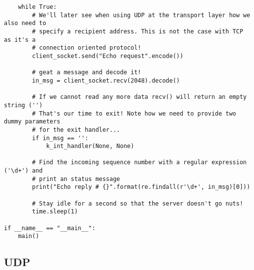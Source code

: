 \documentclass[landscape]{article}
\begin{document}
\begin{verbatim}
    while True:
        # We'll later see when using UDP at the transport layer how we also need to
        # specify a recipient address. This is not the case with TCP as it's a
        # connection oriented protocol!
        client_socket.send("Echo request".encode())

        # geat a message and decode it!
        in_msg = client_socket.recv(2048).decode()

        # If we cannot read any more data recv() will return an empty string ('')
        # That's our time to exit! Note how we need to provide two dummy parameters
        # for the exit handler...
        if in_msg == '':
            k_int_handler(None, None)
        
        # Find the incoming sequence number with a regular expression ('\d+') and
        # print an status message
        print("Echo reply # {}".format(re.findall(r'\d+', in_msg)[0]))

        # Stay idle for a second so that the server doesn't go nuts!
        time.sleep(1)

if __name__ == "__main__":
    main()
                \end{verbatim}

        \subsection{UDP}
\end{document}

